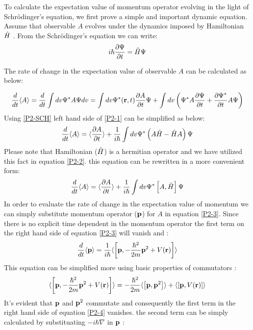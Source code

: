 \begin{homeworkProblem}

 To calculate the expectation value of momentum operator evolving in the light of Schr\"odinger's equation, we first prove a simple and important dynamic equation. Assume that observable  $A$ evolves under the dynamics imposed by Hamiltonian $\Hat{H}$ . From  the Schr\"odinger's equation we can write:
\begin{equation}\label{P2-SCH}
i\hbar\dfrac{\partial \Psi}{\partial t}=\Hat{H}\Psi
\end{equation}

The rate of change in the expectation value of observable $A$ can be calculated as below:

\begin{equation}\label{P2-1}
\frac{d}{dt}\langle A\rangle=\frac{d}{dt}\int dv \Psi^* A \Psi dv=\int dv\Psi^*(\mathbf{r},t)\dfrac{\partial A}{\partial t}\Psi+\int dv\left(\Psi^* A\dfrac{\partial \Psi}{\partial t}+\dfrac{\partial \Psi^*}{\partial t}A\Psi\right)
\end{equation}
Using \eqref{P2-SCH} left hand side of \eqref{P2-1} can be simplified  as below:
\begin{equation}\label{P2-2}
 \frac{d}{dt}\langle A\rangle=\langle\dfrac{\partial A}{\partial t}\rangle+ \frac{1}{i\hbar}\int dv\Psi^*\left (A\Hat{H}-\Hat{H}A\right)\Psi 
\end{equation}
Please note that Hamiltonian  ($\Hat{H}$) is a hermitian operator and we have utilized this fact in equation \eqref{P2-2}. this equation can be rewritten in a more convenient form:
\begin{equation}\label{P2-3}
\frac{d}{dt}\langle A\rangle=\langle\dfrac{\partial A}{\partial t}\rangle+ \frac{1}{i\hbar}\int dv\Psi^*\left[A,\Hat{H}\right]\Psi 
\end{equation}
In order to evaluate the rate of change in the expectation value of momentum we can simply substitute momentum operator ($\mathbf{p}$) for $A$ in equation \eqref{P2-3}. Since there is no explicit time dependent in the momentum operator the first term on the right hand side of equation \eqref{P2-3} will vanish  and :
\begin{equation}
\frac{d}{dt}\langle \mathbf{p}\rangle=\frac{1}{i\hbar}\langle\left[\mathbf{p},-\frac{\hbar^2}{2m}\mathbf{p}^2+V(\mathbf{r})\right]\rangle
\end{equation} 
This equation can be simplified more using basic properties of commutators \cite{sakurai}:
\begin{equation}\label{P2-4}
\langle \left[\mathbf{p},-\frac{\hbar^2}{2m}\mathbf{p}^2+V(\mathbf{r})\right]\rangle=-\frac{\hbar^2}{2m}\langle\left[\mathbf{p},\mathbf{p}^2\right]\rangle+\langle\left[\mathbf{p},V(\mathbf{r})\right]\rangle
\end{equation}
It's evident that $\mathbf{p}$ and $\mathbf{p}^2$ commutate and consequently the first term in the right hand side of equation \eqref{P2-4} vanishes. the second term can be simply calculated by substituating $-i\hbar\nabla$ in $\mathbf{p}$ :


\end{homeworkProblem}

